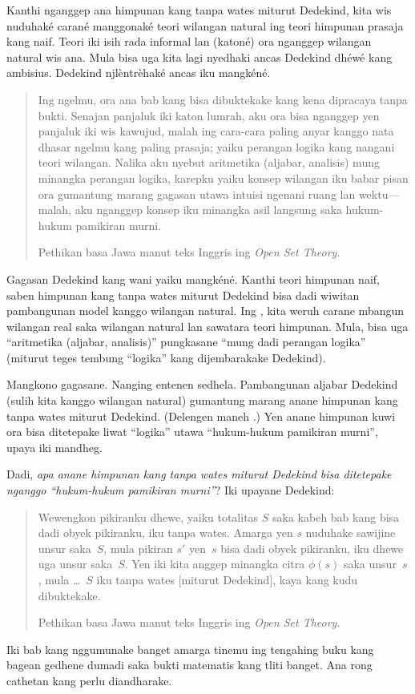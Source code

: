 \documentclass[../../../include/open-logic-section]{subfiles}
\begin{document}
Kanthi nganggep ana himpunan kang tanpa wates miturut Dedekind, kita
wis nuduhaké carané manggonaké teori wilangan natural ing teori himpunan
prasaja kang naif. Teori iki isih rada informal lan (katoné) ora nganggep
wilangan natural wis ana. Mula bisa uga kita lagi nyedhaki ancas Dedekind
dhéwé kang ambisius. Dedekind njlèntrèhaké ancas iku mangkéné.
\begin{quote}
	Ing ngelmu, ora ana bab kang bisa dibuktekake kang kena dipracaya
	tanpa bukti. Senajan panjaluk iki katon lumrah, aku ora bisa nganggep
	yen panjaluk iki wis kawujud, malah ing cara-cara paling anyar kanggo
	nata dhasar ngelmu kang paling prasaja; yaiku perangan logika kang
	nangani teori wilangan. Nalika aku nyebut aritmetika (aljabar,
	analisis) mung minangka perangan logika, karepku yaiku konsep wilangan
	iku babar pisan ora gumantung marang gagasan utawa intuisi ngenani
	ruang lan wektu---malah, aku nganggep konsep iku minangka asil
	langsung saka hukum-hukum pamikiran murni.
	\citep[pambuka]{Dedekind1888}
	\par Pethikan basa Jawa manut teks Inggris ing \emph{Open Set Theory}.
\end{quote}
Gagasan Dedekind kang wani yaiku mangkéné. Kanthi teori himpunan
naif, saben himpunan kang tanpa wates miturut Dedekind bisa dadi
wiwitan pambangunan model kanggo wilangan natural.
Ing , kita weruh carane mbangun wilangan real
saka wilangan natural lan sawatara teori himpunan. Mula, bisa uga
``aritmetika (aljabar, analisis)'' pungkasane ``mung dadi perangan
logika'' (miturut teges tembung ``logika'' kang dijembarakake Dedekind).

Mangkono gagasane. Nanging entenen sedhela. Pambangunan aljabar
Dedekind (sulih kita kanggo wilangan natural) gumantung marang anane
himpunan kang tanpa wates miturut Dedekind. (Delengen maneh
.) Yen
anane himpunan kuwi ora bisa ditetepake liwat ``logika'' utawa
``hukum-hukum pamikiran murni'', upaya iki mandheg.

Dadi, \emph{apa anane himpunan kang tanpa wates miturut Dedekind bisa
ditetepake nganggo ``hukum-hukum pamikiran murni''}? Iki upayane
Dedekind:
\begin{quote}
  Wewengkon pikiranku dhewe, yaiku totalitas $S$ saka kabeh bab kang
  bisa dadi obyek pikiranku, iku tanpa wates. Amarga yen $s$ nuduhake
  sawijine unsur saka~$S$, mula pikiran $s'$ yen~$s$ bisa dadi obyek
  pikiranku, iku dhewe uga unsur saka~$S$. Yen iki kita anggep minangka
  citra $\phi(s)$ saka unsur~$s$, mula \dots~$S$ iku tanpa wates
  [miturut Dedekind], kaya kang kudu dibuktekake.
	\citep[\S66]{Dedekind1888}
	\par Pethikan basa Jawa manut teks Inggris ing \emph{Open Set Theory}.
\end{quote}
Iki bab kang nggumunake banget amarga tinemu ing tengahing buku kang
bagean gedhene dumadi saka bukti matematis kang tliti banget. Ana rong
cathetan kang perlu diandharake.
\end{document}
